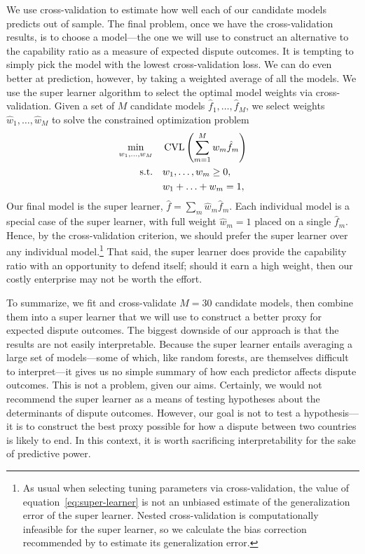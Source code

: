 We use cross-validation to estimate how well each of our candidate models predicts out of sample.
The final problem, once we have the cross-validation results, is to choose a model---the one we will use to construct an alternative to the capability ratio as a measure of expected dispute outcomes.
It is tempting to simply pick the model with the lowest cross-validation loss.
We can do even better at prediction, however, by taking a weighted average of all the models.
We use the super learner algorithm \citep{vanderLaan:bz} to select the optimal model weights via cross-validation.
Given a set of $M$ candidate models $\hat{f}_1, \ldots, \hat{f}_M$, we select weights $\hat{w}_1, \ldots, \hat{w}_M$ to solve the constrained optimization problem
\begin{equation}
  \label{eq:super-learner}
  \begin{aligned}
    \min_{w_1, \ldots, w_M}
    &\quad
    \operatorname{CVL} \left(
      \sum_{m=1}^M w_m \hat{f}_m
    \right)
    \\
    \mbox{s.t.}
    &\quad
    w_1, \ldots, w_m \geq 0,
    \\
    &\quad
    w_1 + \ldots + w_m = 1,
  \end{aligned}
\end{equation}
Our final model is the super learner, $\hat{f} = \sum_m \hat{w}_m \hat{f}_m$.
Each individual model is a special case of the super learner, with full weight $\hat{w}_m = 1$ placed on a single $\hat{f}_m$.
Hence, by the cross-validation criterion, we should prefer the super learner over any individual model.\footnote{
  \label{fn:sl-bias}
  As usual when selecting tuning parameters via cross-validation, the value of equation~\eqref{eq:super-learner} is not an unbiased estimate of the generalization error of the super learner.
  Nested cross-validation is computationally infeasible for the super learner, so we calculate the bias correction recommended by \citet{Tibshirani:2009tz} to estimate its generalization error.
}  That said, the super learner does provide the capability ratio with an opportunity to defend itself; should it earn a high weight, then our costly enterprise may not be worth the effort.

To summarize, we fit and cross-validate $M = 30$ candidate models, then combine them into a super learner that we will use to construct a better proxy for expected dispute outcomes.
The biggest downside of our approach is that the results are not easily interpretable.
Because the super learner entails averaging a large set of models---some of which, like random forests, are themselves difficult to interpret---it gives us no simple summary of how each predictor affects dispute outcomes.
This is not a problem, given our aims.
Certainly, we would not recommend the super learner as a means of testing hypotheses about the determinants of dispute outcomes.
However, our goal is not to test a hypothesis---it is to construct the best proxy possible for how a dispute between two countries is likely to end.
In this context, it is worth sacrificing interpretability for the sake of predictive power.

